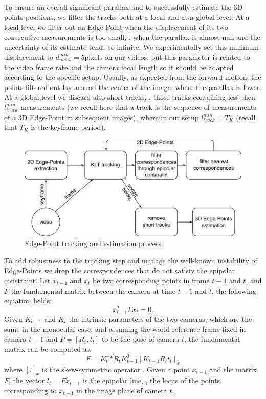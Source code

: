 To ensure  an overall significant parallax and to successfully estimate the 3D points positions, we filter the tracks  both at a local and at a global level.
At a local level we filter out an Edge-Point when the displacement of its two consecutive measurements is too small, \ie, when the parallax is almost null and the uncertainty of its estimate tends to infinite. 
We experimentally set this minimum displacement to $d_{meas}^{min} = 5 \text{pixels}$ on our videos, but this parameter is related to the video frame rate and the camera focal length so it should be adapted according to the specific setup. 
Usually, as expected from the forward motion, the points filtered out lay around the center of the image, where the parallax is lower.
At a global level we discard also short tracks, \ie, those tracks containing less then $l_{track}^{min}$ measurements (we recall here that a track is the sequence of measurements of a 3D Edge-Point in subsequent images), where in our setup $l_{track}^{min} = T_K$ (recall that $T_K$ is the keyframe period). 


\begin{figure}[t]
\centering
\includegraphics[width=0.8\columnwidth]{./img//EdgePoint}
\caption{Edge-Point tracking and estimation process.}
\label{fig:algorithm}
\end{figure}

To add robustness to the tracking step and manage the well-known instability  of Edge-Points  we drop the correspondences that do not satisfy the epipolar constraint. 
Let $x_{t-1}$ and $x_t$ be two corresponding points in frame $t-1$ and $t$, and $F$ the fundamental matrix between the camera at time $t-1$ and $t$, the following equation holds:
\[
 x_{t-1}^{T}Fx_t = 0 .
\]
Given $K_{t-1}$ and $K_t$ the intrinsic parameters of the two cameras, which are the same in the monocular case, and assuming the world reference frame fixed in camera $t-1$ and $P = [R_t,t_t]$ to be the pose of camera $t$, the fundamental matrix can be computed as:
\[
F = K_t^{-T}R_tK_{t-1}^T [K_{t-1}R_{t}t_t]_x
\]
where $[.]_x$ is the skew-symmetric operator \cite{hazi04}.
Given a point $x_{t-1}$ and the matrix $F$, the vector $l_{t} = Fx_{t-1}$ is the epipolar line, \ie, the locus of the points corresponding to $x_{t-1}$ in the image plane of camera $t$. 

